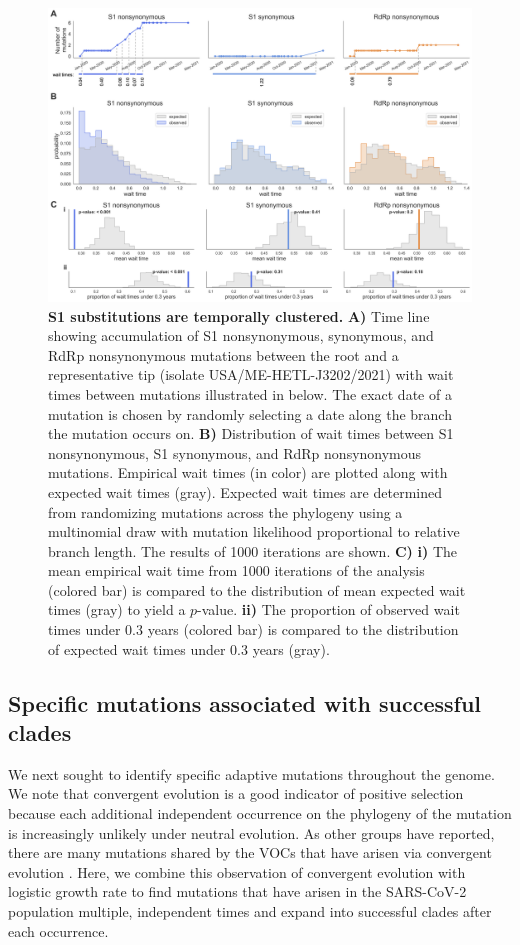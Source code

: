 \documentclass[11pt,oneside,letterpaper]{article}
\begin{document}
\begin{figure}[h!]
	\centerline{\includegraphics[width=1.0\textwidth]{fig3_waittimes.png}}
	\caption{\textbf{S1 substitutions are temporally clustered.}
	\textbf{A)} Time line showing accumulation of S1 nonsynonymous, synonymous, and RdRp nonsynonymous mutations between the root and a representative tip (isolate USA/ME-HETL-J3202/2021) with wait times between mutations illustrated in below.
	The exact date of a mutation is chosen by randomly selecting a date along the branch the mutation occurs on.
	\textbf{B)} Distribution of wait times between S1 nonsynonymous, S1 synonymous, and RdRp nonsynonymous mutations.
	Empirical wait times (in color) are plotted along with expected wait times (gray).
	Expected wait times are determined from randomizing mutations across the phylogeny using a multinomial draw with mutation likelihood proportional to relative branch length.
	The results of 1000 iterations are shown.
	\textbf{C)} \textbf{i)} The mean empirical wait time from 1000 iterations of the analysis (colored bar) is compared to the distribution of mean expected wait times (gray) to yield a $p$-value.
	\textbf{ii)} The proportion of observed wait times under 0.3 years (colored bar) is compared to the distribution of expected wait times under 0.3 years (gray).
	}
	\label{fig:waittimes}
\end{figure}

\subsection*{Specific mutations associated with successful clades}
We next sought to identify specific adaptive mutations throughout the genome.
We note that convergent evolution is a good indicator of positive selection because each additional independent occurrence on the phylogeny of the mutation is increasingly unlikely under neutral evolution.
As other groups have reported, there are many mutations shared by the VOCs that have arisen via convergent evolution \cite{Van_Dorp2020-ox, Rochman2021-sv, Martin2021-lj}.
Here, we combine this observation of convergent evolution with logistic growth rate to find mutations that have arisen in the SARS-CoV-2 population multiple, independent times and expand into successful clades after each occurrence.
\end{document}
